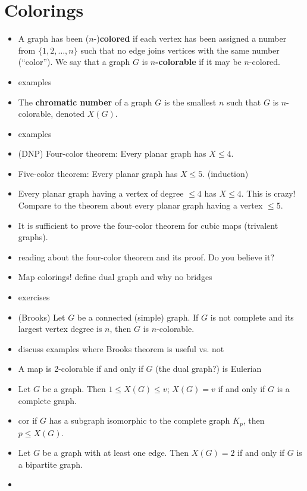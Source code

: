 \section{Colorings}\label{sec:colorings}

\begin{itemize}
    \item A graph has been ($n$-)\textbf{colored} if each vertex has been assigned a number from $\{1, 2, \ldots, n\}$ such that no edge joins vertices with the same number (``color'').  We say that a graph $G$ is \textbf{$n$-colorable} if it may be $n$-colored.
    \item examples
    \item The \textbf{chromatic number} of a graph $G$ is the smallest $n$ such that $G$ is $n$-colorable, denoted $X(G)$.
    \item examples
    \item (DNP) Four-color theorem: Every planar graph has $X \leq 4$.
    \item Five-color theorem: Every planar graph has $X \leq 5$. (induction)
    \item Every planar graph having a vertex of degree $\leq 4$ has $X\leq 4$.  This is crazy!  Compare to the theorem about every planar graph having a vertex $\leq 5$. %
    \item It is sufficient to prove the four-color theorem for cubic maps (trivalent graphs).
    \item reading about the four-color theorem and its proof.  Do you believe it?
    \item Map colorings!  define dual graph and why no bridges
    \item exercises
    \item (Brooks) Let $G$ be a connected (simple) graph.  If $G$ is not complete and its largest vertex degree is $n$, then $G$ is $n$-colorable. %
    \item discuss examples where Brooks theorem is useful vs. not
    \item A map is 2-colorable if and only if $G$ (the dual graph?) is Eulerian

    \item Let $G$ be a graph.  Then $1 \leq X(G) \leq v$; $X(G) = v$ if and only if $G$ is a complete graph.
    \item cor if $G$ has a subgraph isomorphic to the complete graph $K_p$, then $p \leq X(G)$.
    \item Let $G$ be a graph with at least one edge.  Then $X(G)=2$ if and only if $G$ is a bipartite graph.
    \item 

\end{itemize}
